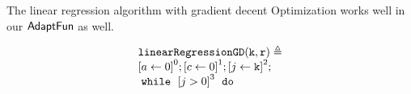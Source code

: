 %
\begin{example}
\label{ex:linearregression}
    The linear regression algorithm with gradient decent Optimization works well 
    in our $\textsf{AdaptFun}$ as well.
\begin{figure}
\centering
\begin{subfigure}{0.4\textwidth}
    \centering
    {\small
        \[
        \begin{array}{l}
            \kw{linearRegressionGD(k, r)} \triangleq \\
                   \clabel{ a \leftarrow 0}^{0} ; 
                   \clabel{ c \leftarrow 0}^{1} ; 
                    \clabel{\assign{j}{\kw{k}} }^{2} ; \\
                    \ewhile ~ \clabel{j > 0}^{3} ~ \edo ~ \\

\end{array}\]}
\end{subfigure}
\end{figure}
\end{example}
